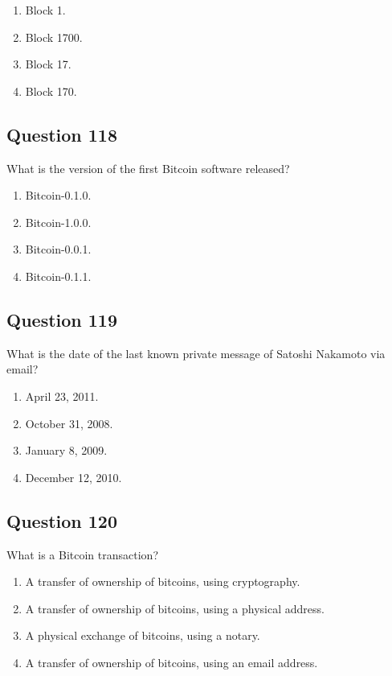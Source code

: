 \documentclass[12pt,a4paper]{article}
\begin{document}
\begin{enumerate}[label=\Alph*., leftmargin=*]
\item Block 1.
\item Block 1700.
\item Block 17.
\item Block 170.
\end{enumerate}

\bigskip


\subsection*{Question 118}
What is the version of the first Bitcoin software released?

\begin{enumerate}[label=\Alph*., leftmargin=*]
\item Bitcoin-0.1.0.
\item Bitcoin-1.0.0.
\item Bitcoin-0.0.1.
\item Bitcoin-0.1.1.
\end{enumerate}

\bigskip


\subsection*{Question 119}
What is the date of the last known private message of Satoshi Nakamoto via email?

\begin{enumerate}[label=\Alph*., leftmargin=*]
\item April 23, 2011.
\item October 31, 2008.
\item January 8, 2009.
\item December 12, 2010.
\end{enumerate}

\bigskip


\subsection*{Question 120}
What is a Bitcoin transaction?

\begin{enumerate}[label=\Alph*., leftmargin=*]
\item A transfer of ownership of bitcoins, using cryptography.
\item A transfer of ownership of bitcoins, using a physical address.
\item A physical exchange of bitcoins, using a notary.
\item A transfer of ownership of bitcoins, using an email address.
\end{enumerate}
\end{document}
